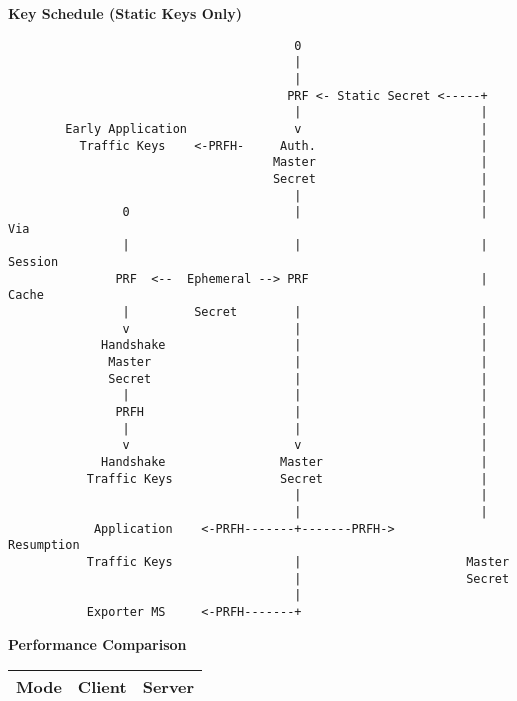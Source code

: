 \documentclass[helvetica]{seminar}
\newcommand{\heading}[1]{%
  \begin{center} 
    \large\bf 
    #1 
  \end{center} 
  \vspace{.4 in}}
\begin{document}
\begin{slide}
\heading{Key Schedule (Static Keys Only)}

\vspace{-.45in}
{\tiny
\begin{verbatim}
                                        0
                                        |                         
                                        |                         
                                       PRF <- Static Secret <-----+
                                        |                         |
        Early Application               v                         |
          Traffic Keys    <-PRFH-     Auth.                       |
                                     Master                       |
                                     Secret                       |
                                        |                         |
                0                       |                         | Via
                |                       |                         | Session
               PRF  <--  Ephemeral --> PRF                        | Cache
                |         Secret        |                         |
                v                       |                         |
             Handshake                  |                         |
              Master                    |                         |
              Secret                    |                         |
                |                       |                         |
               PRFH                     |                         |
                |                       |                         |
                v                       v                         |
             Handshake                Master                      |
           Traffic Keys               Secret                      |
                                        |                         |
                                        |                         |
            Application    <-PRFH-------+-------PRFH->        Resumption        
           Traffic Keys                 |                       Master
                                        |                       Secret  
                                        |
           Exporter MS     <-PRFH-------+
\end{verbatim}
}
\end{slide}

\begin{slide}
\heading{Performance Comparison}

\begin{tabular}{l l l}
Mode & Client & Server \\
\hline
\end{tabular}

\end{slide}
\end{document}

